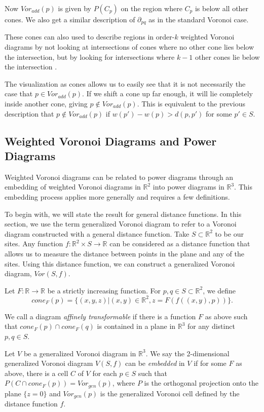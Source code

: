 \documentclass[a4paper, 11pt]{article}
\newcommand{\R}{\mathbb{R}}
\begin{document}
Now $Vor_{add}(p)$ is given by $P(C_p)$ on the region where $C_p$ is below all other
cones. We also get a similar description of $\partial_{pq}$ as in the standard Voronoi case.

These cones can also used to describe regions in order-$k$ weighted Voronoi diagrams by not looking at intersections of cones where no other
cone lies below the intersection, but by looking for intersections where $k-1$ other cones lie below the intersection \cite{rosenberger_additive}.

The visualization as cones allows us to easily see that it is not necessarily the case that $p \in Vor_{add}(p)$. If we shift a cone up far enough, it
will lie completely inside another cone, giving $p \notin Vor_{add}(p)$. This is equivalent to the previous description that $p \notin Vor_{add}(p)$
if $w(p') - w(p) > d(p,p')$ for some $p' \in S$.

\subsection{Weighted Voronoi Diagrams and Power Diagrams}

Weighted Voronoi diagrams can be related to power diagrams through an embedding of weighted Voronoi diagrams in $\R^2$ into power diagrams in $\R^3$.
This embedding process applies more generally and requires a few definitions.

To begin with, we will state the result for general distance functions. In this section, we use the term generalized Voronoi diagram to refer to a
Voronoi diagram constructed with a general distance function. Take $S \subset \R^2$ to be our sites. Any function $f: \R^2 \times S \to \R$
can be considered as a distance function that allows us to measure the distance between points in the plane and any of the sites. Using this distance
function, we can construct a generalized Voronoi diagram, $Vor(S,f)$.

Let $F: \R \to \R$ be a strictly increasing function. For $p,q \in S \subset \R^2$, we define
\[ cone_F(p) = \{ (x,y,z) | (x,y) \in \R^2, z = F( f( (x,y), p) ) \}. \]

We call a diagram \textit{affinely transformable} if there is a function $F$ as above such that $cone_F(p) \cap cone_F(q)$ is contained in a plane in $\R^3$ for any distinct
$p,q \in S$.

Let $V$ be a generalized Voronoi diagram in $\R^3$. We say the 2-dimensional generalized Voronoi diagram $V(S,f)$ can be \textit{embedded} in $V$ if for some $F$ as above,
there is a cell $C$ of $V$ for each $p \in S$ such that $P( C \cap cone_F(p)) = Vor_{gen}(p)$, where $P$ is the orthogonal projection onto the plane $\{ z =
0 \}$ and $Vor_{gen}(p)$ is the generalized Voronoi cell defined
by the distance function $f$.
\end{document}

